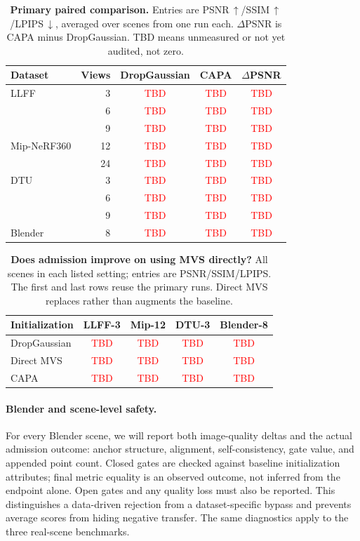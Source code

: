 \documentclass{article}
\newcommand{\ours}{CAPA}
\newcommand{\PH}[1]{\textcolor{red}{#1}}
\newcommand{\pending}{\PH{\textnormal{TBD}}}
\newcommand{\triplet}{\pending}
\begin{document}
\begin{table}[t]
\caption{\textbf{Primary paired comparison.} Entries are PSNR$\,\uparrow$/SSIM$\,\uparrow$/LPIPS$\,\downarrow$, averaged over scenes from one run each. $\Delta$PSNR is \ours{} minus DropGaussian. TBD means unmeasured or not yet audited, not zero.}
\label{tab:main}
\centering\small
\setlength{\tabcolsep}{6pt}
\begin{tabular}{@{}lrccc@{}}
\toprule
Dataset & Views & DropGaussian & \ours{} & $\Delta$PSNR\\
\midrule
LLFF & 3 & \triplet & \triplet & \pending\\
 & 6 & \triplet & \triplet & \pending\\
 & 9 & \triplet & \triplet & \pending\\
Mip-NeRF360 & 12 & \triplet & \triplet & \pending\\
 & 24 & \triplet & \triplet & \pending\\
DTU & 3 & \triplet & \triplet & \pending\\
 & 6 & \triplet & \triplet & \pending\\
 & 9 & \triplet & \triplet & \pending\\
Blender & 8 & \triplet & \triplet & \pending\\
\bottomrule
\end{tabular}
\end{table}

\begin{table}[t]
\caption{\textbf{Does admission improve on using MVS directly?} All scenes in each listed setting; entries are PSNR/SSIM/LPIPS. The first and last rows reuse the primary runs. Direct MVS replaces rather than augments the baseline.}
\label{tab:mvs}
\centering\small
\begin{tabular}{@{}lcccc@{}}
\toprule
Initialization & LLFF-3 & Mip-12 & DTU-3 & Blender-8\\
\midrule
DropGaussian & \triplet & \triplet & \triplet & \triplet\\
Direct MVS & \triplet & \triplet & \triplet & \triplet\\
\ours{} & \triplet & \triplet & \triplet & \triplet\\
\bottomrule
\end{tabular}
\end{table}

\paragraph{Blender and scene-level safety.}
For every Blender scene, we will report both image-quality deltas and the actual admission outcome: anchor structure, alignment, self-consistency, gate value, and appended point count. Closed gates are checked against baseline initialization attributes; final metric equality is an observed outcome, not inferred from the endpoint alone. Open gates and any quality loss must also be reported. This distinguishes a data-driven rejection from a dataset-specific bypass and prevents average scores from hiding negative transfer. The same diagnostics apply to the three real-scene benchmarks.
\end{document}
